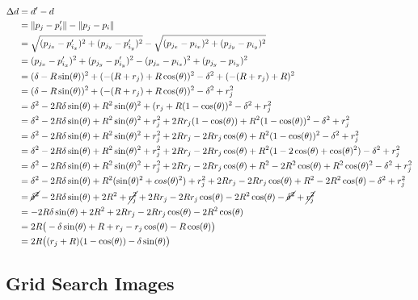\documentclass[conference]{IEEEtran}
\begin{document}
    \begin{align*}
      \Delta d &= d' - d \\
      &= \lVert p_j - p'_i \rVert - \lVert p_j - p_i \rVert \\
      &=\sqrt{(p_{j_x} - p'_{i_x})^2 + (p_{j_y} - p'_{i_y})^2} - \sqrt{(p_{j_x} - p_{i_x})^2 + (p_{j_y} - p_{i_y})^2} \\
      &=(p_{j_x} - p'_{i_x})^2 + (p_{j_y} - p'_{i_y})^2 - (p_{j_x} - p_{i_x})^2 + (p_{j_y} - p_{i_y})^2 \\
      &= (\delta - R\sin(\theta))^2 + (-(R+r_j) + R\cos(\theta))^2 - \delta^2 + (-(R+r_j) + R)^2 \\
      &= (\delta - R\sin(\theta))^2 + (-(R+r_j) + R\cos(\theta))^2 - \delta^2 + r_j^2 \\
      &= \delta^2 - 2R\delta\sin(\theta) + R^2\sin(\theta)^2 + (r_j + R(1 - \cos(\theta))^2 - \delta^2 + r_j^2 \\
      &= \delta^2 - 2R\delta\sin(\theta) + R^2\sin(\theta)^2 + r_j^2 + 2Rr_j(1 - \cos(\theta)) + R^2(1 - \cos(\theta))^2 - \delta^2 + r_j^2 \\
      &= \delta^2 - 2R\delta\sin(\theta) + R^2\sin(\theta)^2 + r_j^2 + 2Rr_j - 2Rr_j\cos(\theta) + R^2(1 - \cos(\theta))^2 - \delta^2 + r_j^2 \\
      &= \delta^2 - 2R\delta\sin(\theta) + R^2\sin(\theta)^2 + r_j^2 + 2Rr_j - 2Rr_j\cos(\theta) + R^2(1 - 2\cos(\theta) + \cos(\theta)^2) - \delta^2 + r_j^2 \\
      &= \delta^2 - 2R\delta\sin(\theta) + R^2\sin(\theta)^2 + r_j^2 + 2Rr_j - 2Rr_j\cos(\theta) + R^2 - 2R^2\cos(\theta) + R^2\cos(\theta)^2 - \delta^2 + r_j^2 \\
      &= \delta^2 - 2R\delta\sin(\theta) + R^2(\sin(\theta)^2 + cos(\theta)^2) + r_j^2 + 2Rr_j - 2Rr_j\cos(\theta) + R^2 - 2R^2\cos(\theta) - \delta^2 + r_j^2 \\
      &= \cancel{\delta^2} - 2R\delta\sin(\theta) + 2R^2 + \cancel{r_j^2} + 2Rr_j - 2Rr_j\cos(\theta) - 2R^2\cos(\theta) - \cancel{\delta^2} + \cancel{r_j^2} \\
      &= -2R\delta\sin(\theta) + 2R^2 + 2Rr_j - 2Rr_j\cos(\theta) - 2R^2\cos(\theta) \\
      &= 2R\big(-\delta\sin(\theta) + R + r_j - r_j\cos(\theta) - R\cos(\theta)\big) \\
      &= 2R\big((r_j + R)(1 - \cos(\theta))-\delta\sin(\theta)\big)
    \end{align*}

  \pagebreak
  \subsection{Grid Search Images} \label{section:grid_search_images}
\end{document}
